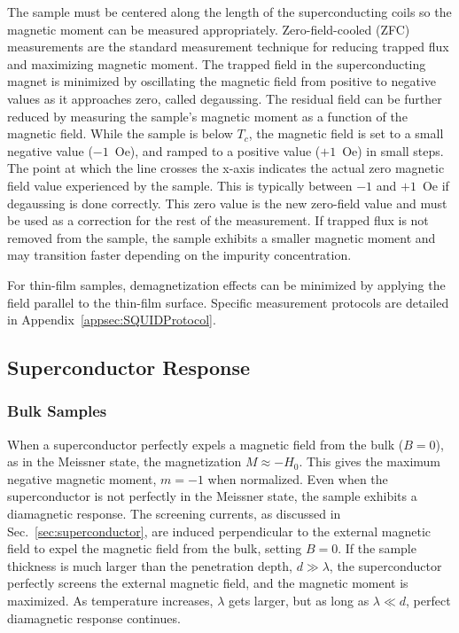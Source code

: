     The sample must be centered along the length of the superconducting coils so the magnetic moment can be measured appropriately. Zero-field-cooled (ZFC) measurements are the standard measurement technique for reducing trapped flux and maximizing magnetic moment. The trapped field in the superconducting magnet is minimized by oscillating the magnetic field from positive to negative values as it approaches zero, called degaussing. The residual field can be further reduced by measuring the sample's magnetic moment as a function of the magnetic field. While the sample is below $T_c$, the magnetic field is set to a small negative value ($-1$~Oe), and ramped to a positive value ($+1$~Oe) in small steps. The point at which the line crosses the x-axis indicates the actual zero magnetic field value experienced by the sample. This is typically between $-1$ and $+1$~Oe if degaussing is done correctly. This zero value is the new zero-field value and must be used as a correction for the rest of the measurement. If trapped flux is not removed from the sample, the sample exhibits a smaller magnetic moment and may transition faster depending on the impurity concentration.
    
    For thin-film samples, demagnetization effects can be minimized by applying the field parallel to the thin-film surface. Specific measurement protocols are detailed in Appendix~\ref{appsec:SQUIDProtocol}.
    
    \subsection{Superconductor Response}
    
    \subsubsection{Bulk Samples}
    
    When a superconductor perfectly expels a magnetic field from the bulk ($B = 0$), as in the Meissner state, the magnetization $M \approx -H_0$. This gives the maximum negative magnetic moment, $m = -1$ when normalized. Even when the superconductor is not perfectly in the Meissner state, the sample exhibits a diamagnetic response. The screening currents, as discussed in Sec.~\ref{sec:superconductor}, are induced perpendicular to the external magnetic field to expel the magnetic field from the bulk, setting $B = 0$. If the sample thickness is much larger than the penetration depth, $d \gg \lambda$, the superconductor perfectly screens the external magnetic field, and the magnetic moment is maximized. As temperature increases, $\lambda$ gets larger, but as long as $\lambda \ll d$, perfect diamagnetic response continues.
    
